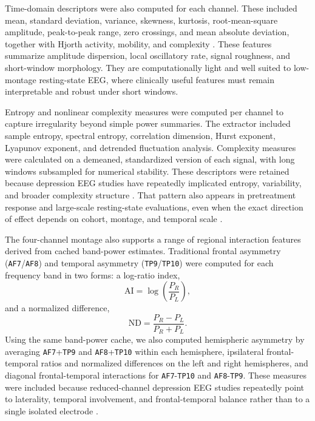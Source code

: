 \begin{paperwidetable}
  \centering
  \caption{Summary of extracted EEG feature families per analysis window.}
  \label{tab:feature-summary}
  \footnotesize
  
\end{paperwidetable}

Time-domain descriptors were also computed for each channel. These included mean, standard deviation, variance, skewness, kurtosis, root-mean-square amplitude, peak-to-peak range, zero crossings, and mean absolute deviation, together with Hjorth activity, mobility, and complexity \citep{Zhang2023EEGMethods,Hjorth1970}. These features summarize amplitude dispersion, local oscillatory rate, signal roughness, and short-window morphology. They are computationally light and well suited to low-montage resting-state EEG, where clinically useful features must remain interpretable and robust under short windows.

Entropy and nonlinear complexity measures were computed per channel to capture irregularity beyond simple power summaries. The extractor included sample entropy, spectral entropy, correlation dimension, Hurst exponent, Lyapunov exponent, and detrended fluctuation analysis. Complexity measures were calculated on a demeaned, standardized version of each signal, with long windows subsampled for numerical stability. These descriptors were retained because depression EEG studies have repeatedly implicated entropy, variability, and broader complexity structure \citep{Puthankattil2012,Faust2014,Acharya2015}. That pattern also appears in pretreatment response and large-scale resting-state evaluations, even when the exact direction of effect depends on cohort, montage, and temporal scale \citep{Zhao2022,Jaworska2018,Lord2023}.

The four-channel montage also supports a range of regional interaction features derived from cached band-power estimates. Traditional frontal asymmetry (\texttt{AF7}/\texttt{AF8}) and temporal asymmetry (\texttt{TP9}/\texttt{TP10}) were computed for each frequency band in two forms: a log-ratio index,
\[
\mathrm{AI}=\log\!\left(\frac{P_R}{P_L}\right),
\]
and a normalized difference,
\[
\mathrm{ND}=\frac{P_R-P_L}{P_R+P_L}.
\]
Using the same band-power cache, we also computed hemispheric asymmetry by averaging \texttt{AF7}+\texttt{TP9} and \texttt{AF8}+\texttt{TP10} within each hemisphere, ipsilateral frontal-temporal ratios and normalized differences on the left and right hemispheres, and diagonal frontal-temporal interactions for \texttt{AF7}-\texttt{TP10} and \texttt{AF8}-\texttt{TP9}. These measures were included because reduced-channel depression EEG studies repeatedly point to laterality, temporal involvement, and frontal-temporal balance rather than to a single isolated electrode \citep{Ghiasi2021,Mahato2020,Monni2022}.

